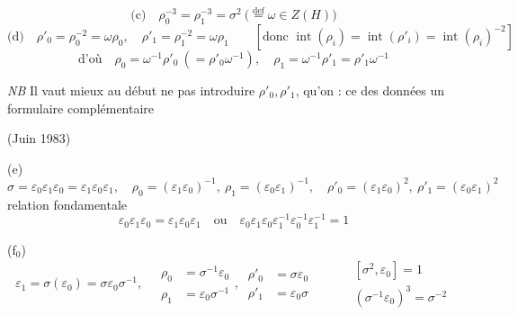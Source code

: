 \documentclass[11pt,a4paper]{article}
\begin{document}
\[
\text{(c)} \quad \rho_0^{-3} = \rho_1^{-3} = \sigma^{2} \ \Big(\overset{\mathrm{def}}{=} \omega \in Z(H)\Big)
\]
\[
\text{(d)} \quad \rho'_0 = \rho_0^{-2} = \omega\rho_0, \quad \rho'_1 = \rho_1^{-2} = \omega\rho_1
\qquad [\text{donc } \operatorname{int}(\rho_i) = \operatorname{int}(\rho'_i) = \operatorname{int}(\rho_i)^{-2}]
\]
\[
\text{d'où} \quad \rho_0 = \omega^{-1}\rho'_0 \ (= \rho'_0\omega^{-1}), \quad \rho_1 = \omega^{-1}\rho'_1 = \rho'_1\omega^{-1}
\]

\emph{NB} Il vaut mieux au début ne pas introduire $\rho'_0, \rho'_1$, qu'on  : ce   des données un formulaire complémentaire  

(Juin 1983)


(e) 
\[
\sigma = \varepsilon_0\varepsilon_1\varepsilon_0 = \varepsilon_1\varepsilon_0\varepsilon_1, \quad
\rho_0 = (\varepsilon_1\varepsilon_0)^{-1}, \ \rho_1 = (\varepsilon_0\varepsilon_1)^{-1}, \quad
\rho'_0 = (\varepsilon_1\varepsilon_0)^2, \ \rho'_1 = (\varepsilon_0\varepsilon_1)^2
\]
relation fondamentale
\[
\boxed{\varepsilon_0\varepsilon_1\varepsilon_0 = \varepsilon_1\varepsilon_0\varepsilon_1 \quad \text{ou} \quad \varepsilon_0\varepsilon_1\varepsilon_0\varepsilon_1^{-1}\varepsilon_0^{-1}\varepsilon_1^{-1} = 1}
\]

(f$_0$) 
\[
\varepsilon_1 = \sigma(\varepsilon_0) = \sigma\varepsilon_0\sigma^{-1}, \quad
\boxed{\begin{aligned} \rho_0 &= \sigma^{-1}\varepsilon_0 \\ \rho_1 &= \varepsilon_0\sigma^{-1} \end{aligned}}, \
\begin{aligned} \rho'_0 &= \sigma\varepsilon_0 \\ \rho'_1 &= \varepsilon_0\sigma \end{aligned}
\qquad
\boxed{\begin{aligned} &[\sigma^2, \varepsilon_0] = 1 \\ &(\sigma^{-1}\varepsilon_0)^3 = \sigma^{-2} \end{aligned}}
\]
\end{document}
